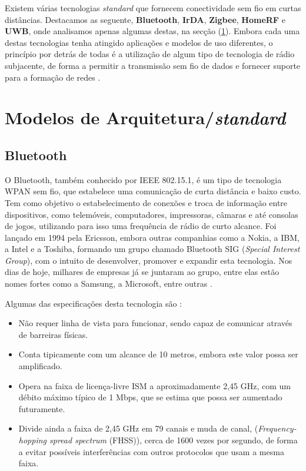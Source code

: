 \documentclass[conference]{IEEEtran}
\begin{document}
Existem várias tecnologias \textit{standard} que fornecem conectividade sem fio em curtas distâncias. 
Destacamos as seguente, \textbf{Bluetooth}, \textbf{IrDA}, \textbf{Zigbee}, \textbf{HomeRF} e \textbf{UWB}, onde analisamos apenas algumas destas, na secção (\ref{arquiteturas}).
Embora cada uma destas tecnologias tenha atingido aplicações e modelos de uso diferentes, o princípio por detrás de todas é a utilização de algum tipo de tecnologia de rádio subjacente, de forma a permitir a transmissão sem fio de dados e fornecer suporte para a formação de redes \cite{prasad2004ofdm}.


\section{Modelos de Arquitetura/\textit{standard}} \label{arquiteturas}

\subsection{Bluetooth} \label{bluetooth}

O Bluetooth, também conhecido por IEEE 802.15.1, é um tipo de tecnologia WPAN sem fio, que estabelece uma comunicação de curta distância e baixo custo. 
Tem como objetivo o estabelecimento de conexões e troca de informação entre dispositivos, como telemóveis, computadores, impressoras, câmaras e até consolas de jogos, utilizando para isso uma frequência de rádio de curto alcance. 
Foi lançado em 1994 pela Ericsson, embora outras companhias como a Nokia, a IBM, a Intel e a Toshiba, formando um grupo chamado Bluetooth SIG (\textit{Special Interest Group}), com o intuito de desenvolver, promover e expandir esta tecnologia. 
Nos dias de hoje, milhares de empresas já se juntaram ao grupo, entre elas estão nomes fortes como a Samsung, a Microsoft, entre outras \cite{bluetoothwiki}.

Algumas das especificações desta tecnologia são \cite{kobayashi2004tecnologia}:

\begin{itemize}

 \item Não requer linha de vista para funcionar, sendo capaz de comunicar através de barreiras físicas.
 \item Conta tipicamente com um alcance de 10 metros, embora este valor possa ser amplificado. 
 \item Opera na faixa de licença-livre ISM a aproximadamente 2,45 GHz, com um débito máximo típico de 1 Mbps, que se estima que possa ser aumentado futuramente.
 \item Divide ainda a faixa de 2,45 GHz em 79 canais e muda de canal, (\textit{Frequency-hopping spread spectrum} (FHSS)), cerca de 1600 vezes por segundo, de forma a evitar possíveis interferências com outros protocolos que usam a mesma faixa.

\end{itemize}
\end{document}
